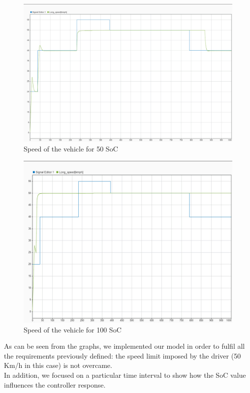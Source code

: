 \documentclass[12pt,a4paper]{report}
\begin{document}
\begin{figure}[htbp]
	\centering
	\includegraphics[scale=0.2]{50_soc.jpeg}
	\caption{Speed of the vehicle for 50 SoC}
\end{figure}

\begin{figure}[htbp]
	\centering
	\includegraphics[scale=0.2]{100_soc.jpeg}
	\caption{Speed of the vehicle for 100 SoC}
\end{figure}

As can be seen from the graphs, we implemented our model in order to fulfil all the requirements previously defined: the speed limit imposed by the driver (50 Km/h in this case) is not overcame.\\
In addition, we focused on a particular time interval to show how the SoC value influences the controller response.\\
\end{document}
